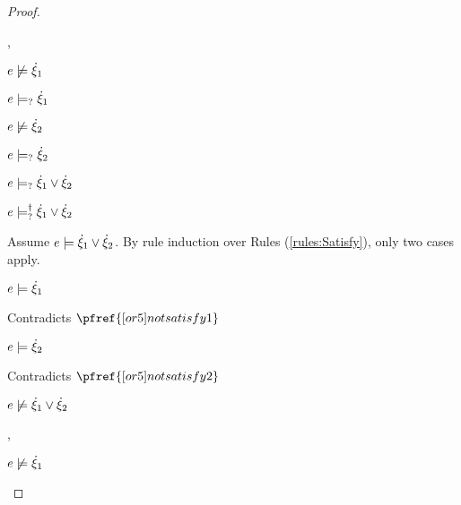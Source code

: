 \begin{proof}
\begin{byCases}
\begin{byCases}
    \item[\cmaysatisfy{e}{\hxi_1},\cmaysatisfy{e}{\hxi_2}]
        \begin{pfsteps*}
        \item $e \not\models \dot{\xi}_1$  
        \item $e \models_{?} \dot{\xi}_1$  
        \item $e \not\models \dot{\xi}_2$  
        \item $e \models_{?} \dot{\xi}_2$  
        \item $e \models_{?} \dot{\xi}_1 \vee \dot{\xi}_2$  
        \item $e \models_{?}^{\dag} \dot{\xi}_1 \vee \dot{\xi}_2$ 
        \end{pfsteps*}
        Assume $e \models \dot{\xi}_1 \vee \dot{\xi}_2$. By rule induction over Rules (\ref{rules:Satisfy}), only two cases apply.
        \begin{byCases}
        \item[\text{(\ref{rule:CSOr1})}]
            \begin{pfsteps*}
            \item $e \models \dot{\xi}_1$ 
            \end{pfsteps*}
            Contradicts $\pfref{[or5]notsatisfy1}$
        \item[\text{(\ref{rule:CSOr2})}]
            \begin{pfsteps*}
            \item $e \models \dot{\xi}_2$ 
            \end{pfsteps*}
            Contradicts $\pfref{[or5]notsatisfy2}$
        \end{byCases}
        \begin{pfsteps*}
        \item $e \not\models \dot{\xi}_1 \vee \dot{\xi}_2$ 
        \end{pfsteps*}
    \item[\cmaysatisfy{e}{\hxi_1},\cnotsatisfyormay{e}{\hxi_2}]
        \begin{pfsteps*}
        \item $e \not\models \dot{\xi}_1$  

\end{pfsteps*}
\end{byCases}
\end{byCases}
\end{proof}
